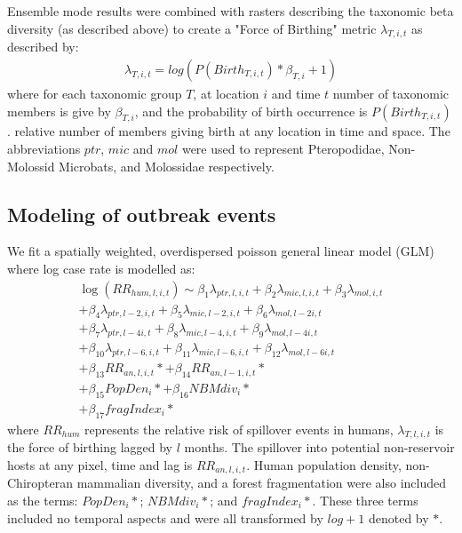 \documentclass[9pt,twoside,lineno]{pnas-new}
\begin{document}
Ensemble mode results were combined with rasters describing the taxonomic beta diversity (as described above) to create a "Force of Birthing" metric $\lambda_{T,i,t}$ as described by:\newline
 \begin{equation}
 \begin{gathered}
 	\lambda_{T,i,t} = log(P(Birth_{T,i,t})*\beta_{T,i} +1)
 \end{gathered}
 \end{equation}
where for each taxonomic group $T$, at location $i$ and time $t$ number of taxonomic members is give by $\beta_{T,i}$, and the probability of birth occurrence is $P(Birth_{T,i,t})$.
relative number of members giving birth at any location in time and space. The abbreviations $ptr$, $mic$ and $mol$ were used to represent Pteropodidae, Non-Molossid Microbats, and Molossidae respectively.  

\subsection*{Modeling of outbreak events}
\label{spatGLM}
We fit a spatially weighted, overdispersed poisson general linear model (GLM) where log case rate is modelled as:
\begin{equation}
\begin{gathered}
\log(RR_{hum, l, i, t}) \sim \beta_1 \lambda_{ptr, l, i, t} + \beta_2 \lambda_{mic, l, i, t} + \beta_3 \lambda_{mol, i, t} \\
+ \beta_4 \lambda_{ptr, l-2, i, t} + \beta_5 \lambda_{mic, l-2, i, t} + \beta_6 \lambda_{mol, l-2 i, t} \\
+ \beta_7 \lambda_{ptr, l-4 i, t} + \beta_8 \lambda_{mic, l-4, i, t} + \beta_9 \lambda_{mol, l-4 i, t} \\
+ \beta_{10} \lambda_{ptr, l-6, i, t} + \beta_{11} \lambda_{mic, l-6, i, t} + \beta_{12} \lambda_{mol, l-6 i, t} \\
+ \beta_{13} RR_{an, l, i, t}* + \beta_{14} RR_{an, l-1, i, t}*  \\
+ \beta_{15} PopDen_{i}* + \beta_{16} NBM div_{i}* \\
+ \beta_{17} fragIndex_{i}* 
\end{gathered}
\end{equation}
where $RR_{hum}$ represents the relative risk of spillover events in humans, $\lambda_{T, l, i, t}$ is the force of birthing lagged by $l$ months.
The spillover into potential non-reservoir hosts at any pixel, time and lag is $RR_{an, l , i, t}$. Human population density, non-Chiropteran mammalian diversity, and a forest fragmentation were also included as the terms: $PopDen_{i}*$; $NBM div_{i}*$; and $fragIndex_{i}*$.
These three terms included no temporal aspects and were all transformed by $log +1$ denoted by $*$. \par 
\end{document}
